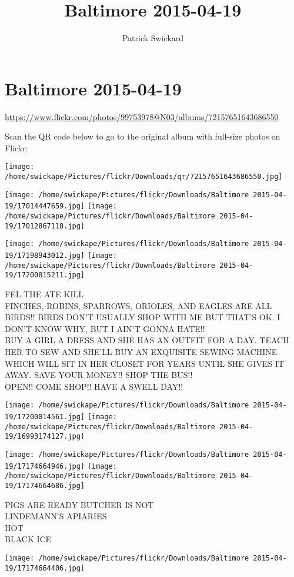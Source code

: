 \documentclass[10pt,letterpaper]{article}
\title{Baltimore 2015-04-19}
\author{Patrick Swickard}
\date{}
\begin{document}
\section*{Baltimore 2015-04-19}

\url{https://www.flickr.com/photos/99753978@N03/albums/72157651643686550}

Scan the QR code below to go to the original album with full-size photos on Flickr:

\texttt{[image: /home/swickape/Pictures/flickr/Downloads/qr/72157651643686550.jpg]}
\pagebreak

\texttt{[image: /home/swickape/Pictures/flickr/Downloads/Baltimore 2015-04-19/17014447659.jpg]}
\texttt{[image: /home/swickape/Pictures/flickr/Downloads/Baltimore 2015-04-19/17012867118.jpg]}

\texttt{[image: /home/swickape/Pictures/flickr/Downloads/Baltimore 2015-04-19/17198943012.jpg]}
\texttt{[image: /home/swickape/Pictures/flickr/Downloads/Baltimore 2015-04-19/17200015211.jpg]}

FEL THE ATE KILL\\
FINCHES, ROBINS, SPARROWS, ORIOLES, AND EAGLES ARE ALL BIRDS!!  BIRDS DON'T USUALLY SHOP WITH ME BUT THAT'S OK.  I DON'T KNOW WHY, BUT I AIN'T GONNA HATE!!\\
BUY A GIRL A DRESS AND SHE HAS AN OUTFIT FOR A DAY.  TEACH HER TO SEW AND SHE'LL BUY AN EXQUISITE SEWING MACHINE WHICH WILL SIT IN HER CLOSET FOR YEARS UNTIL SHE GIVES IT AWAY.  SAVE YOUR MONEY!! SHOP THE BUS!!\\
OPEN!! COME SHOP!! HAVE A SWELL DAY!!
\pagebreak

\texttt{[image: /home/swickape/Pictures/flickr/Downloads/Baltimore 2015-04-19/17200014561.jpg]}
\texttt{[image: /home/swickape/Pictures/flickr/Downloads/Baltimore 2015-04-19/16993174127.jpg]}

\texttt{[image: /home/swickape/Pictures/flickr/Downloads/Baltimore 2015-04-19/17174664946.jpg]}
\texttt{[image: /home/swickape/Pictures/flickr/Downloads/Baltimore 2015-04-19/17174664686.jpg]}

PIGS ARE READY BUTCHER IS NOT\\
LINDEMANN'S APIARIES\\
HOT\\
BLACK ICE
\pagebreak

\texttt{[image: /home/swickape/Pictures/flickr/Downloads/Baltimore 2015-04-19/17174664406.jpg]}
\end{document}
